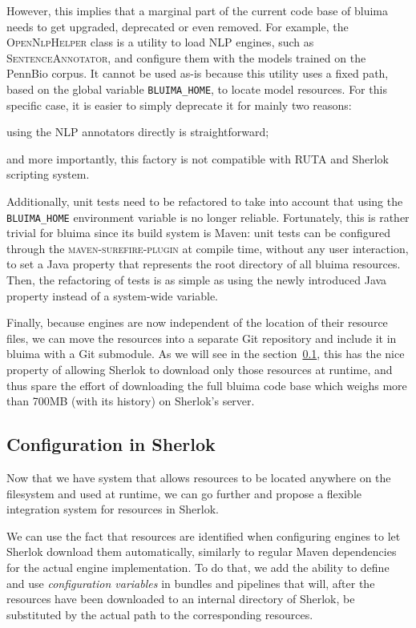 \documentclass{article}
\newcommand{\ID}[1]{{\textsc{#1}}}
\newcommand{\VAR}[1]{\mbox{\texttt{#1}}}
\begin{document}
However, this implies that a marginal part of the current code base of bluima needs to get upgraded,
deprecated or even removed. For example, the \ID{OpenNlp\-Helper} class is a utility to load NLP
engines, such as \ID{Sentence\-Annotator}, and configure them with the models trained on the
PennBio corpus. It cannot be used as-is because this utility uses a fixed path, based on the global
variable \VAR{BLUIMA\_HOME}, to locate model resources. For this specific case, it is easier to
simply deprecate it for mainly two reasons:
\begin{enumerate*}[label=\itshape\alph*\upshape)]
    \item using the NLP annotators directly is straightforward;
    \item and more importantly, this factory is not compatible with RUTA and Sherlok scripting system.
\end{enumerate*}

Additionally, unit tests need to be refactored to take into account that using the
\VAR{BLUIMA\_HOME} environment variable is no longer reliable. Fortunately, this is rather trivial
for bluima since its build system is Maven: unit tests can be configured through the
\ID{maven-surefire-plugin} at compile time, without any user interaction, to set a Java property
that represents the root directory of all bluima resources. Then, the refactoring of tests is as
simple as using the newly introduced Java property instead of a system-wide variable.

Finally, because engines are now independent of the location of their resource files, we can move
the resources into a separate Git repository and include it in bluima with a Git submodule. As we
will see in the section~\ref{sec:config_in_sherlok}, this has the nice property of allowing Sherlok
to download only those resources at runtime, and thus spare the effort of downloading the full
bluima code base which weighs more than 700MB (with its history) on Sherlok's server.

\subsection{Configuration in Sherlok}
\label{sec:config_in_sherlok}

Now that we have system that allows resources to be located anywhere on the filesystem and used at
runtime, we can go further and propose a flexible integration system for resources in Sherlok.

We can use the fact that resources are identified when configuring engines to let Sherlok download
them automatically, similarly to regular Maven dependencies for the actual engine implementation. To
do that, we add the ability to define and use \emph{configuration variables} in bundles and
pipelines that will, after the resources have been downloaded to an internal directory of Sherlok,
be substituted by the actual path to the corresponding resources.
\end{document}
